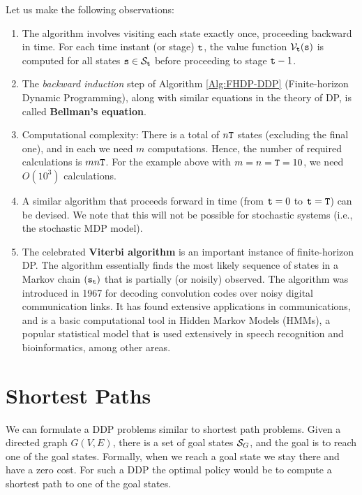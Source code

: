 Let us make
the following observations:
\begin{enumerate}
  \item
The algorithm involves visiting each state exactly once, proceeding
backward in time. For each time instant (or stage) ${\tt t}$, the
value function ${\mathcal{V}_{{\tt t}}}({\tt s})$ is computed for all
states ${\tt s} \in {\mathcal{S}_{{\tt t}}}$ before proceeding to stage
${\tt t} - 1$.
  \item
The {\em backward induction} step of Algorithm \ref{Alg:FHDP-DDP} (Finite-horizon Dynamic Programming),
along with similar equations in the theory of DP, is called
\textbf{Bellman's equation}.
  \item
Computational complexity: There is a total of $n{\tt T}$ states
(excluding the final one), and in each we need $m$ computations.
Hence, the number of required calculations is $mn{\tt T}$. For the
example above with $m = n = {\tt T} = 10$, we need $O({10^3})$
calculations.
  \item
A similar algorithm that proceeds forward in time (from ${\tt t} = 0$
to ${\tt t} = {\tt T}$) can be devised. We note that this will not
be possible for stochastic systems (i.e., the stochastic MDP model).
  \item
The celebrated \textbf{Viterbi algorithm} is an important instance
of finite-horizon DP. The algorithm essentially finds the most
likely sequence of states in a Markov chain $({{\tt s}_{{\tt t}}})$
that is partially (or noisily) observed. The algorithm was
introduced in 1967 for decoding convolution codes over noisy digital
communication links. It has found extensive applications in
communications, and is a basic computational tool in Hidden Markov
Models (HMMs), a popular statistical model that is used extensively
in speech recognition and bioinformatics, among other areas.
\end{enumerate}


\section{Shortest Paths}
We can formulate a DDP problems similar to shortest path problems.
Given a directed graph $G(V,E)$,  there is a set of goal states
$\mathcal{S}_G$, and the goal is to reach one of the goal states.
Formally, when we reach a goal state we stay there and have a zero
cost. For such a DDP the optimal policy would be to compute a
shortest path to one of the goal states.

